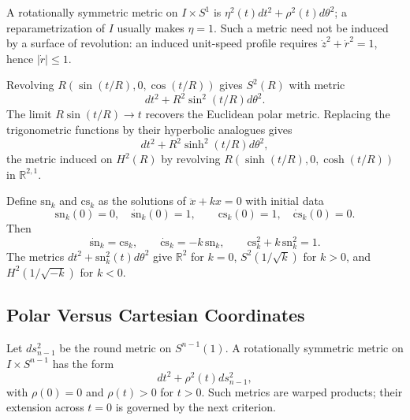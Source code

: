 \begin{remark}
  \label{rem:pet-ch1-rotationally-symmetric}
  \leanok
  A rotationally symmetric metric on $I\times S^1$ is
  $\eta^2(t)dt^2+\rho^2(t)d\theta^2$; a reparametrization of $I$ usually makes
  $\eta=1$. Such a metric need not be induced by a surface of revolution:
  an induced unit-speed profile requires $\dot z^2+\dot r^2=1$, hence
  $|\dot r|\le1$.
\end{remark}

\begin{example}
  \label{ex:pet-ch1-sphere-revolution}
  \leanok
  Revolving $R(\sin(t/R),0,\cos(t/R))$ gives $S^2(R)$ with metric
  \[
    dt^2+R^2\sin^2(t/R)d\theta^2.
  \]
  The limit $R\sin(t/R)\to t$ recovers the Euclidean polar metric. Replacing
  the trigonometric functions by their hyperbolic analogues gives
  \[
    dt^2+R^2\sinh^2(t/R)d\theta^2,
  \]
  the metric induced on $H^2(R)$ by revolving
  $R(\sinh(t/R),0,\cosh(t/R))$ in $\mathbb{R}^{2,1}$.
\end{example}

\begin{definition}
  \label{def:pet-ch1-snk-csk}
  \leanok
  Define $\mathrm{sn}_k$ and $\mathrm{cs}_k$ as the solutions of
  $\ddot x+kx=0$ with initial data
  \[
    \mathrm{sn}_k(0)=0,\quad \dot{\mathrm{sn}}_k(0)=1,
    \qquad
    \mathrm{cs}_k(0)=1,\quad \dot{\mathrm{cs}}_k(0)=0.
  \]
  Then
  \[
    \dot{\mathrm{sn}}_k=\mathrm{cs}_k,\qquad
    \dot{\mathrm{cs}}_k=-k\,\mathrm{sn}_k,\qquad
    \mathrm{cs}_k^2+k\,\mathrm{sn}_k^2=1.
  \]
  The metrics $dt^2+\mathrm{sn}_k^2(t)d\theta^2$ give
  $\mathbb{R}^2$ for $k=0$, $S^2(1/\sqrt{k})$ for $k>0$, and
  $H^2(1/\sqrt{-k})$ for $k<0$.
\end{definition}

\subsection{Polar Versus Cartesian Coordinates}

\begin{definition}
  \label{def:pet-ch1-rot-sym-general}
  \leanok
  Let $ds_{n-1}^2$ be the round metric on $S^{n-1}(1)$. A rotationally
  symmetric metric on $I\times S^{n-1}$ has the form
  \[
    dt^2+\rho^2(t)ds_{n-1}^2,
  \]
  with $\rho(0)=0$ and $\rho(t)>0$ for $t>0$. Such metrics are warped products;
  their extension across $t=0$ is governed by the next criterion.
\end{definition}

